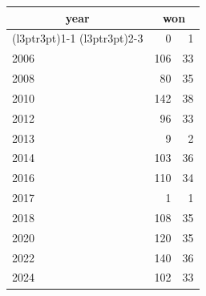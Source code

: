 \footnotesize\begin{tabular}[t]{lrr}
\toprule
\multicolumn{1}{c}{year} & \multicolumn{2}{c}{won} \\
\cmidrule(l{3pt}r{3pt}){1-1} \cmidrule(l{3pt}r{3pt}){2-3}
  & 0 & 1\\
\midrule
2006 & 106 & 33\\
2008 & 80 & 35\\
2010 & 142 & 38\\
2012 & 96 & 33\\
2013 & 9 & 2\\
2014 & 103 & 36\\
2016 & 110 & 34\\
2017 & 1 & 1\\
2018 & 108 & 35\\
2020 & 120 & 35\\
2022 & 140 & 36\\
2024 & 102 & 33\\
\bottomrule
\end{tabular}
